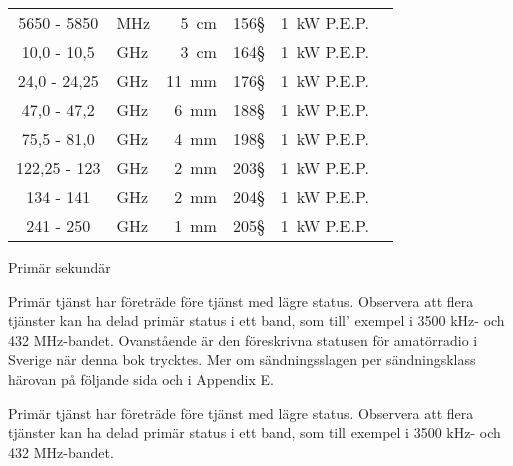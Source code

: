 \begin{tabular}{clr|rr|l}
 5650   -  5850 & MHz &   5~cm & 156§  & 1~kW P.E.P.  & \\
   10,0 -  10,5 & GHz &   3~cm & 164§  & 1~kW P.E.P.  & \\
   24,0 - 24,25 & GHz &  11~mm & 176§  & 1~kW P.E.P.  & \\
   47,0 - 47,2  & GHz &   6~mm & 188§  & 1~kW P.E.P.  & \\
   75,5 - 81,0  & GHz &   4~mm & 198§  & 1~kW P.E.P.  & \\
 122,25 - 123   & GHz &   2~mm & 203§  & 1~kW P.E.P.  & \\
    134 - 141   & GHz &   2~mm & 204§  & 1~kW P.E.P.  & \\
    241 - 250   & GHz &   1~mm & 205§  & 1~kW P.E.P.  & \\
\end{tabular}

Primär
sekundär

Primär tjänst har företräde före tjänst med lägre status.
Observera att flera tjänster kan ha delad primär status i ett band, som till'
exempel i 3500 kHz- och 432 MHz-bandet.
Ovanstående är den föreskrivna statusen för amatörradio i Sverige när
denna bok trycktes.
Mer om sändningsslagen per sändningsklass härovan på följande sida och
i Appendix E.

Primär tjänst har företräde före tjänst med lägre status.
Observera att flera tjänster kan ha delad primär status i ett band,
som till exempel i 3500 kHz- och 432 MHz-bandet.


